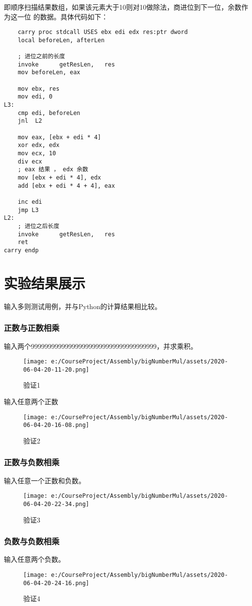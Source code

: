即顺序扫描结果数组，如果该元素大于10则对10做除法，商进位到下一位，余数作为这一位
的数据。具体代码如下：

\begin{lstlisting}
    carry proc stdcall USES ebx edi edx res:ptr dword
    local beforeLen, afterLen

    ; 进位之前的长度
    invoke      getResLen,   res
    mov beforeLen, eax

    mov ebx, res
    mov edi, 0
L3:
    cmp edi, beforeLen
    jnl  L2
    
    mov eax, [ebx + edi * 4]
    xor edx, edx
    mov ecx, 10
    div ecx
    ; eax 结果 ， edx 余数
    mov [ebx + edi * 4], edx
    add [ebx + edi * 4 + 4], eax

    inc edi
    jmp L3
L2:
    ; 进位之后长度
    invoke      getResLen,   res
    ret
carry endp
\end{lstlisting}


\section{实验结果展示}
输入多则测试用例，并与Python的计算结果相比较。

\subsubsection{正数与正数相乘}
输入两个9999999999999999999999999999999999999，并求乘积。

\begin{figure}[H]
    \centering
    \texttt{[image: e:/CourseProject/Assembly/bigNumberMul/assets/2020-06-04-20-11-20.png]}
    \caption{验证1}
    \label{验证1}
\end{figure}

输入任意两个正数
\begin{figure}[H]
    \centering
    \texttt{[image: e:/CourseProject/Assembly/bigNumberMul/assets/2020-06-04-20-16-08.png]}
    \caption{验证2}
    \label{验证2}
\end{figure}

\subsubsection{正数与负数相乘}

输入任意一个正数和负数。

\begin{figure}[H]
    \centering
    \texttt{[image: e:/CourseProject/Assembly/bigNumberMul/assets/2020-06-04-20-22-34.png]}
    \caption{验证3}
    \label{验证3}
\end{figure}


\subsubsection{负数与负数相乘}

输入任意两个负数。

\begin{figure}[H]
    \centering
    \texttt{[image: e:/CourseProject/Assembly/bigNumberMul/assets/2020-06-04-20-24-16.png]}
    \caption{验证4}
    \label{验证4}
\end{figure}

